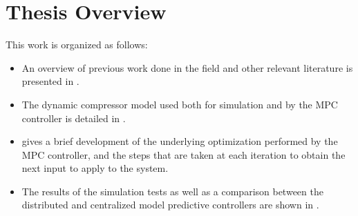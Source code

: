 \section{Thesis Overview}
\label{sec:intro:overview}

This work is organized as follows:

\begin{itemize}
  \item An overview of previous work done in the field and other relevant literature is presented in .
  \item The dynamic compressor model used both for simulation and by the MPC controller is detailed in .
  \item {} gives a brief development of the underlying optimization performed by the MPC controller, and the steps that are taken at each iteration to obtain the next input to apply to the system.
  \item The results of the simulation tests as well as a comparison between the distributed and centralized model predictive controllers are shown in .
\end{itemize}

